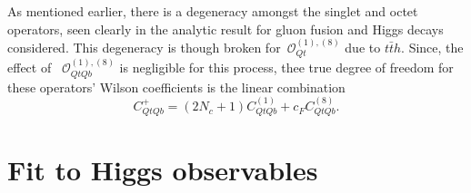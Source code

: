 \par As mentioned earlier, there is a degeneracy amongst the singlet and octet operators, seen clearly in the analytic result for gluon fusion and Higgs decays considered. This degeneracy is though broken for~$\mathcal O_{Qt}^{(1),(8)}$ due to $t\bar t h$. Since, the effect of ~$\mathcal O_{QtQb}^{(1),(8)}$ is negligible for this process, thee true  degree of freedom for these operators' Wilson coefficients is the linear combination
\begin{equation}
	C_{QtQb}^+= (2N_c+1 )C_{QtQb}^{(1)} + c_F   C_{QtQb}^{(8)}.
	\label{eq:CQtQbplus}
\end{equation}
%
\section{Fit to Higgs observables \label{sec:fit}}

